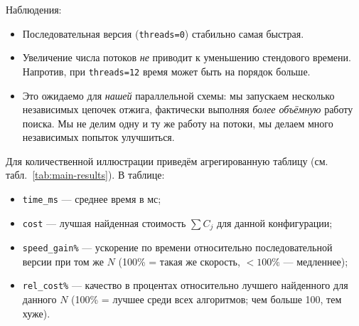 \documentclass[a4paper,12pt]{article}
\begin{document}
Наблюдения:
\begin{itemize}
    \item Последовательная версия (\texttt{threads=0}) стабильно самая быстрая.
    \item Увеличение числа потоков \emph{не} приводит к уменьшению стендового времени. Напротив, при \texttt{threads=12} время может быть на порядок больше.
    \item Это ожидаемо для \emph{нашей} параллельной схемы: мы запускаем несколько независимых цепочек отжига, фактически выполняя \emph{более объёмную} работу поиска. Мы не делим одну и ту же работу на потоки, мы делаем много независимых попыток улучшиться.
\end{itemize}

Для количественной иллюстрации приведём агрегированную таблицу (см. табл.~\ref{tab:main-results}). В таблице:
\begin{itemize}
    \item \texttt{time\_ms} --- среднее время в мс;
    \item \texttt{cost} --- лучшая найденная стоимость $\sum C_j$ для данной конфигурации;
    \item \texttt{speed\_gain\%} --- ускорение по времени относительно последовательной версии при том же $N$ (100\% = такая же скорость, $<100\%$ --- медленнее);
    \item \texttt{rel\_cost\%} --- качество в процентах относительно лучшего найденного для данного $N$ (100\% = лучшее среди всех алгоритмов; чем больше 100, тем хуже).
\end{itemize}
\end{document}

